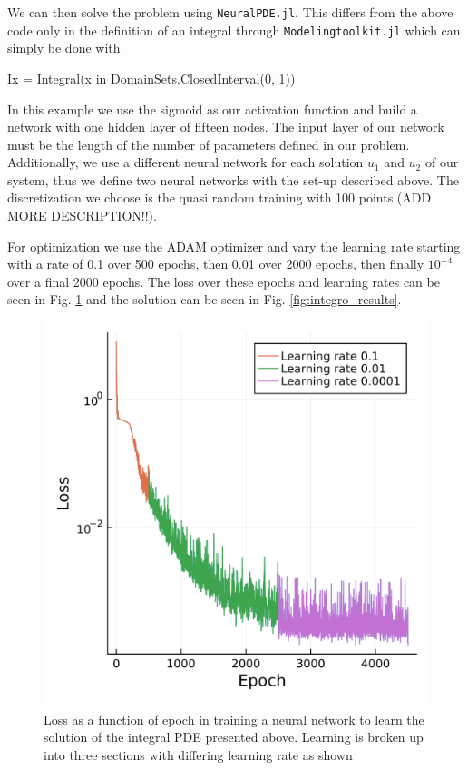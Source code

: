 \documentclass{CUP-JNL-DTM}%
\theoremstyle{definition}
\numberwithin{equation}{section}
\begin{document}
We can then solve the problem using \texttt{NeuralPDE.jl}. This differs from the above code only in the definition of an integral through \texttt{Modelingtoolkit.jl} which can simply be done with

\begin{jllisting}
Ix = Integral(x in DomainSets.ClosedInterval(0, 1))
\end{jllisting}

In this example we use the sigmoid as our activation function and build a network with one hidden layer of fifteen nodes. The input layer of our network must be the length of the number of parameters defined in our problem. Additionally, we use a different neural network for each solution $u_1$ and $u_2$ of our system, thus we define two neural networks with the set-up described above. The discretization we choose is the quasi random training with 100 points (ADD MORE DESCRIPTION!!). 

For optimization we use the ADAM optimizer and vary the learning rate starting with a rate of 0.1 over 500 epochs, then 0.01 over 2000 epochs, then finally $10^{-4}$ over a final 2000 epochs. The loss over these epochs and learning rates can be seen in Fig. \ref{fig:loss_integro} and the solution can be seen in Fig. \ref{fig:integro_results}.

\begin{figure}
\centering
    \includegraphics[width=0.4\linewidth]{figures/integral_PDE_plots/loss.png}
    \caption{Loss as a function of epoch in training a neural network to learn the solution of the integral PDE presented above. Learning is broken up into three sections with differing learning rate as shown}
    \label{fig:loss_integro}
\end{figure}
\end{document}
